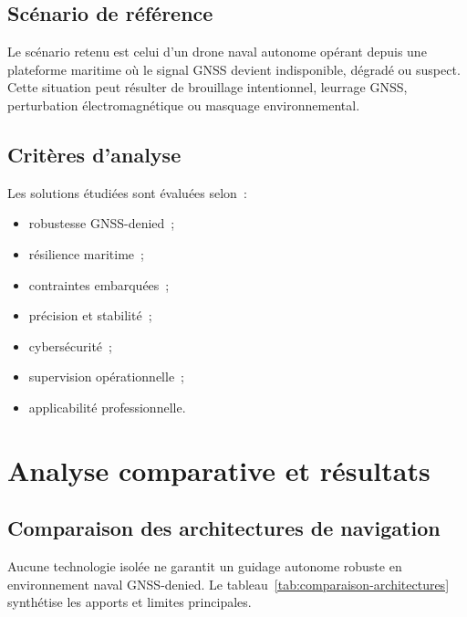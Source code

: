 \documentclass[12pt, a4paper, twoside, openright]{report}
\begin{document}
\section{Scénario de référence}

Le scénario retenu est celui d'un drone naval autonome opérant depuis une plateforme maritime où le signal GNSS devient indisponible, dégradé ou suspect. Cette situation peut résulter de brouillage intentionnel, leurrage GNSS, perturbation électromagnétique ou masquage environnemental.

\section{Critères d'analyse}

Les solutions étudiées sont évaluées selon~:

\begin{itemize}
    \item robustesse GNSS-denied~;
    \item résilience maritime~;
    \item contraintes embarquées~;
    \item précision et stabilité~;
    \item cybersécurité~;
    \item supervision opérationnelle~;
    \item applicabilité professionnelle.
\end{itemize}

\cleardoublepage

\chapter{Analyse comparative et résultats}\label{chap:analyse}

\section{Comparaison des architectures de navigation}

Aucune technologie isolée ne garantit un guidage autonome robuste en environnement naval GNSS-denied. Le tableau~\ref{tab:comparaison-architectures} synthétise les apports et limites principales.
\end{document}
